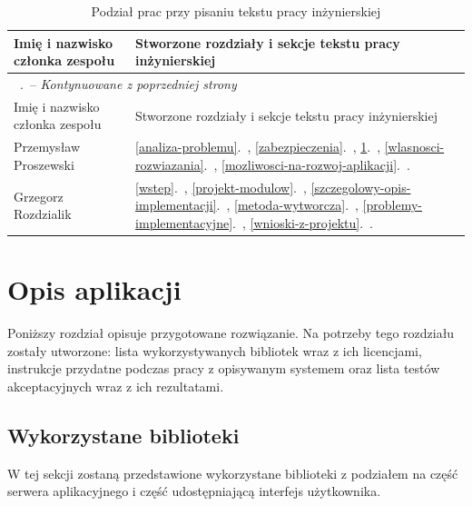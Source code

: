 \documentclass[a4paper,11pt,twoside]{report}
\renewcommand*{\thetable}{\arabic{chapter}.\arabic{table}}
\theoremstyle{definition}
\begin{document}
    \begin{longtable}{| p{} | p{} |}
        \caption{Podział prac przy pisaniu tekstu pracy inżynierskiej}
        \label{podzial-prac-tekst-pracy} \\
        \hline
        Imię i nazwisko członka zespołu & Stworzone rozdziały i sekcje tekstu pracy inżynierskiej \\ \hline
        \endfirsthead
        \multicolumn{2}{l}{\footnotesize \tablename\ \thetable\ -- \textit{Kontynuowane z poprzedniej strony}} \\
        \hline
        Imię i nazwisko członka zespołu & Stworzone rozdziały i sekcje tekstu pracy inżynierskiej \\ \hline
        \endhead
        
        Przemysław Proszewski &
        \ref{analiza-problemu}.~\nameref{analiza-problemu},
        \ref{zabezpieczenia}.~\nameref{zabezpieczenia},
        \ref{opis-aplikacji}.~\nameref{opis-aplikacji},
        \ref{wlasnosci-rozwiazania}.~\nameref{wlasnosci-rozwiazania},
        \ref{mozliwosci-na-rozwoj-aplikacji}.~\nameref{mozliwosci-na-rozwoj-aplikacji}. \\ \hline
        
        Grzegorz Rozdzialik &
        \ref{wstep}.~\nameref{wstep},
        \ref{projekt-modulow}.~\nameref{projekt-modulow},
        \ref{szczegolowy-opis-implementacji}.~\nameref{szczegolowy-opis-implementacji},
        \ref{metoda-wytworcza}.~\nameref{metoda-wytworcza},
        \ref{problemy-implementacyjne}.~\nameref{problemy-implementacyjne},
        \ref{wnioski-z-projektu}.~\nameref{wnioski-z-projektu}. \\ \hline
    \end{longtable}

\chapter{Opis aplikacji}
    \label{opis-aplikacji}
    Poniższy rozdział opisuje przygotowane rozwiązanie. Na potrzeby tego rozdziału zostały utworzone: lista wykorzystywanych bibliotek wraz z ich licencjami, instrukcje przydatne podczas pracy z opisywanym systemem oraz lista testów akceptacyjnych wraz z ich rezultatami.
    
    \section{Wykorzystane biblioteki}
         W tej sekcji zostaną przedstawione wykorzystane biblioteki z podziałem na część serwera aplikacyjnego i część udostępniającą interfejs użytkownika.
        
\end{document}
